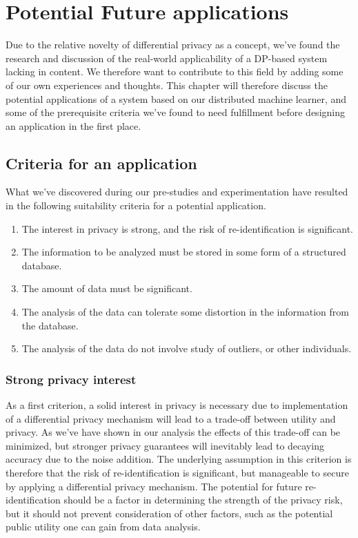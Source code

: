 \chapter{Potential Future applications}
Due to the relative novelty of differential privacy as a concept, we've found the research and discussion of the real-world applicability of a DP-based system lacking in content. We therefore want to contribute to this field by adding some of our own experiences and thoughts.  This chapter will therefore discuss the potential applications of a system based on our distributed machine learner, and some of the prerequisite criteria we've found to need fulfillment before designing an application in the first place.   

\section{Criteria for an application}
What we've discovered during our pre-studies and experimentation have resulted in the following suitability criteria for a potential application. 
\begin{enumerate}
	\item The interest in privacy is strong, and the risk of re-identification is significant.
	\item The information to be analyzed must be stored in some form of a structured database.
	\item The amount of data must be significant.
	\item The analysis of the data can tolerate some distortion in the information from the database.
	\item The analysis of the data do not involve study of outliers, or other individuals.
\end{enumerate}

\subsection{Strong privacy interest}
As a first criterion, a solid interest in privacy is necessary due to implementation of a differential privacy mechanism will lead to a trade-off between utility and privacy. As we've have shown in our analysis the effects of this trade-off can be minimized, but stronger privacy guarantees will inevitably lead to decaying accuracy due to the noise addition. The underlying assumption in this criterion is therefore that the risk of re-identification is significant, but manageable to secure by applying a differential privacy mechanism. The potential for future re-identification should be a factor in determining the strength of the privacy risk, but it should not prevent consideration of other factors, such as the potential public utility one can gain from data analysis.

